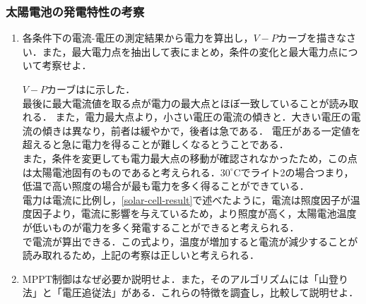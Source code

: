 \clearpage
\subsubsection{太陽電池の発電特性の考察}
\begin{enumerate}[(1)]
	\item 各条件下の電流-電圧の測定結果から電力を算出し，$V-P$カーブを描きなさい．また，最大電力点を抽出して表にまとめ，条件の変化と最大電力点について考察せよ．
	
	$V-P$カーブはに示した．\\
	最後に最大電流値を取る点が電力の最大点とほぼ一致していることが読み取れる．
	また，電力最大点より，小さい電圧の電流の傾きと．大きい電圧の電流の傾きは異なり，前者は緩やかで，後者は急である．
	電圧がある一定値を超えると急に電力を得ることが難しくなるとうことである．\\
	また，条件を変更しても電力最大点の移動が確認されなかったため，この点は太陽電池固有のものであると考えられる．$30^{\circ}$Cでライト2の場合つまり，低温で高い照度の場合が最も電力を多く得ることができている．\\
	電力は電流に比例し，\ref{solar-cell-result}で述べたように，電流は照度因子が温度因子より，電流に影響を与えているため，より照度が高く，太陽電池温度が低いものが電力を多く発電することができると考えられる．\\
	で電流が算出できる．この式より，温度が増加すると電流が減少することが読み取れるため，上記の考察は正しいと考えられる．
	\item MPPT制御はなぜ必要か説明せよ．また，そのアルゴリズムには「山登り法」と「電圧追従法」がある．これらの特徴を調査し，比較して説明せよ．
	

\end{enumerate}
